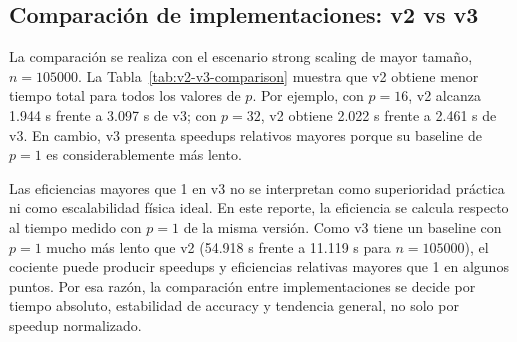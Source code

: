 \documentclass[11pt,a4paper]{article}
\begin{document}
\subsection{Comparación de implementaciones: v2 vs v3}

La comparación se realiza con el escenario strong scaling de mayor tamaño, $n=105000$. La
Tabla~\ref{tab:v2-v3-comparison} muestra que v2 obtiene menor tiempo total para todos los valores
de $p$. Por ejemplo, con $p=16$, v2 alcanza 1.944 s frente a 3.097 s de v3; con $p=32$, v2 obtiene
2.022 s frente a 2.461 s de v3. En cambio, v3 presenta speedups relativos mayores porque su
baseline de $p=1$ es considerablemente más lento.

\begin{table}[H]
\centering
{}
\caption{Comparación v2 vs v3 para strong scaling con $n=105000$. v2 domina en tiempo absoluto; v3 obtiene mayor speedup relativo por partir de un tiempo base más alto.}
\label{tab:v2-v3-comparison}
\end{table}

Las eficiencias mayores que 1 en v3 no se interpretan como superioridad práctica ni como
escalabilidad física ideal. En este reporte, la eficiencia se calcula respecto al tiempo medido
con $p=1$ de la misma versión. Como v3 tiene un baseline con $p=1$ mucho más lento que v2
(54.918 s frente a 11.119 s para $n=105000$), el cociente puede producir speedups y eficiencias
relativas mayores que 1 en algunos puntos. Por esa razón, la comparación entre implementaciones
se decide por tiempo absoluto, estabilidad de accuracy y tendencia general, no solo por speedup
normalizado.
\end{document}
